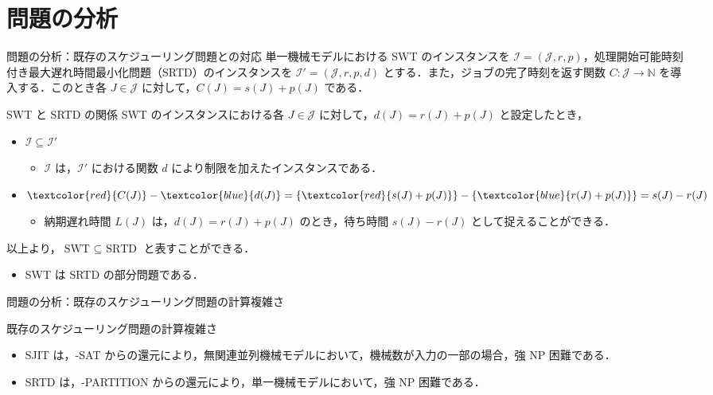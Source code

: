 \documentclass[dvipdfmx]{beamer}
\begin{document}
    \section{問題の分析}
    \begin{frame}{問題の分析：既存のスケジューリング問題との対応}
      単一機械モデルにおける SWT のインスタンスを $\mathcal{I} = (\mathcal{J},r,p)$，処理開始可能時刻付き最大遅れ時間最小化問題（SRTD）のインスタンスを $\mathcal{I}' = (\mathcal{J},r,p,d)$ とする．また，ジョブの完了時刻を返す関数 $C : \mathcal{J} \to \mathbb{N}$ を導入する．このとき各 $J \in \mathcal{J}$ に対して，$C(J) = s(J) + p(J)$ である．
      \begin{block}{SWT と SRTD の関係}
        SWT のインスタンスにおける各 $J \in \mathcal{J}$ に対して，$d(J) = r(J) + p(J)$ と設定したとき，
        \begin{itemize}
          \item $\mathcal{I} \subseteq \mathcal{I}'$
          \begin{itemize}
            \item $\mathcal{I}$ は，$\mathcal{I}'$ における関数 $d$ により制限を加えたインスタンスである．
          \end{itemize}
          \item   $\textcolor{red}{C(J)} - \textcolor{blue}{d(J)}  =
          \{\textcolor{red}{s(J) + p(J)}\} - \{\textcolor{blue}{r(J) + p(J)}\}
          = s(J) - r(J)$
          \begin{itemize}
            \item 納期遅れ時間 $L(J)$ は，$d(J) = r(J) + p(J)$ のとき，待ち時間 $s(J) - r(J)$ として捉えることができる．
          \end{itemize}
        \end{itemize}
      \end{block}
      以上より，$\text{SWT } \subseteq \text{ SRTD}$ と表すことができる．
      \begin{itemize}
        \item SWT は SRTD の\alert{部分問題}である．
      \end{itemize}
    \end{frame}

    \begin{frame}{問題の分析：既存のスケジューリング問題の計算複雑さ}
      \begin{block}{既存のスケジューリング問題の計算複雑さ}
        \begin{itemize}
          \item SJIT は，{-SAT} からの還元により，無関連並列機械モデルにおいて，機械数が入力の一部の場合，\alert{強 NP 困難}である．
          \item SRTD は，{-PARTITION} からの還元により，単一機械モデルにおいて，\alert{強 NP  困難}である．
        \end{itemize}
      \end{block}
    \end{frame}
\end{document}
